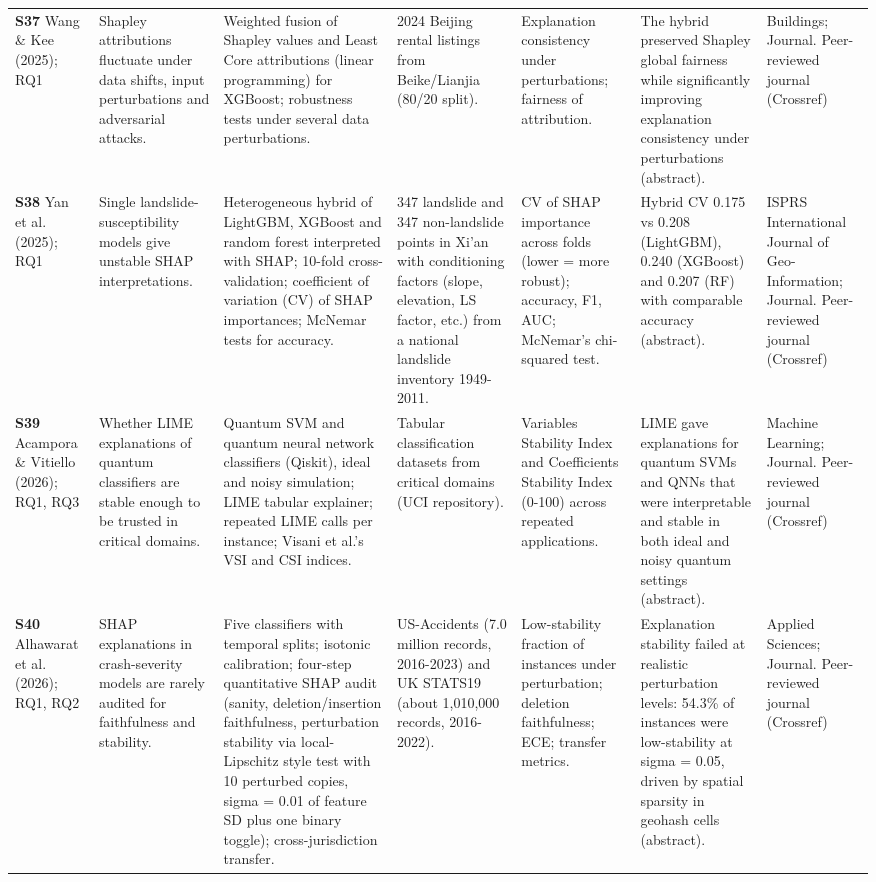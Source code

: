 \begin{longtable}{@{}P{1.55cm}P{2.9cm}P{4.5cm}P{3.2cm}P{3.4cm}P{4.6cm}P{3.6cm}@{}}
\textbf{S37} \cite{S37} Wang \& Kee (2025); RQ1 & Shapley attributions fluctuate under data shifts, input perturbations and adversarial attacks. & Weighted fusion of Shapley values and Least Core attributions (linear programming) for XGBoost; robustness tests under several data perturbations. & 2024 Beijing rental listings from Beike/\allowbreak{}Lianjia (80/\allowbreak{}20 split). & Explanation consistency under perturbations; fairness of attribution. & The hybrid preserved Shapley global fairness while significantly improving explanation consistency under perturbations (abstract). & Buildings; Journal. Peer-reviewed journal (Crossref) \\
\textbf{S38} \cite{S38} Yan et al. (2025); RQ1 & Single landslide-susceptibility models give unstable SHAP interpretations. & Heterogeneous hybrid of LightGBM, XGBoost and random forest interpreted with SHAP; 10-fold cross-validation; coefficient of variation (CV) of SHAP importances; McNemar tests for accuracy. & 347 landslide and 347 non-landslide points in Xi'an with conditioning factors (slope, elevation, LS factor, etc.) from a national landslide inventory 1949-2011. & CV of SHAP importance across folds (lower = more robust); accuracy, F1, AUC; McNemar's chi-squared test. & Hybrid CV 0.175 vs 0.208 (LightGBM), 0.240 (XGBoost) and 0.207 (RF) with comparable accuracy (abstract). & ISPRS International Journal of Geo-Information; Journal. Peer-reviewed journal (Crossref) \\
\textbf{S39} \cite{S39} Acampora \& Vitiello (2026); RQ1, RQ3 & Whether LIME explanations of quantum classifiers are stable enough to be trusted in critical domains. & Quantum SVM and quantum neural network classifiers (Qiskit), ideal and noisy simulation; LIME tabular explainer; repeated LIME calls per instance; Visani et al.'s VSI and CSI indices. & Tabular classification datasets from critical domains (UCI repository). & Variables Stability Index and Coefficients Stability Index (0-100) across repeated applications. & LIME gave explanations for quantum SVMs and QNNs that were interpretable and stable in both ideal and noisy quantum settings (abstract). & Machine Learning; Journal. Peer-reviewed journal (Crossref) \\
\textbf{S40} \cite{S40} Alhawarat et al. (2026); RQ1, RQ2 & SHAP explanations in crash-severity models are rarely audited for faithfulness and stability. & Five classifiers with temporal splits; isotonic calibration; four-step quantitative SHAP audit (sanity, deletion/\allowbreak{}insertion faithfulness, perturbation stability via local-Lipschitz style test with 10 perturbed copies, sigma = 0.01 of feature SD plus one binary toggle); cross-jurisdiction transfer. & US-Accidents (7.0 million records, 2016-2023) and UK STATS19 (about 1,010,000 records, 2016-2022). & Low-stability fraction of instances under perturbation; deletion faithfulness; ECE; transfer metrics. & Explanation stability failed at realistic perturbation levels: 54.3\% of instances were low-stability at sigma = 0.05, driven by spatial sparsity in geohash cells (abstract). & Applied Sciences; Journal. Peer-reviewed journal (Crossref) \\

\end{longtable}
